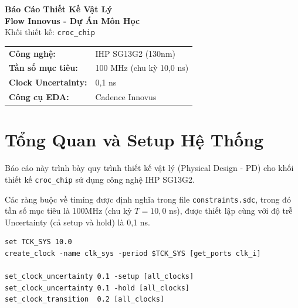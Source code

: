 \documentclass[12pt,a4paper]{article}
\begin{document}
\begin{titlepage}
\centering
\vspace*{2cm}
{\Huge\bfseries Báo Cáo Thiết Kế Vật Lý\\[0.3cm]}
{\Huge\bfseries Flow Innovus - Dự Án Môn Học\\[0.5cm]}
{\Large Khối thiết kế: \texttt{croc\_chip}}\\[1cm]

\vspace{1cm}
{\large
\begin{tabular}{ll}
\textbf{Công nghệ:} & IHP SG13G2 (130nm) \\
\textbf{Tần số mục tiêu:} & 100 MHz (chu kỳ 10,0 ns) \\
\textbf{Clock Uncertainty:} & 0,1 ns \\
\textbf{Công cụ EDA:} & Cadence Innovus \\
\end{tabular}
}

\vspace{2cm}
\vfill
\end{titlepage}

\tableofcontents
\newpage

\section{Tổng Quan và Setup Hệ Thống}
Báo cáo này trình bày quy trình thiết kế vật lý (Physical Design - PD) cho khối thiết kế \texttt{croc\_chip} sử dụng công nghệ IHP SG13G2.

Các ràng buộc về timing được định nghĩa trong file \texttt{constraints.sdc}, trong đó tần số mục tiêu là 100MHz (chu kỳ $T = 10,0$ ns), được thiết lập cùng với độ trễ Uncertainty (cả setup và hold) là 0,1 ns.

\begin{lstlisting}[caption={Quy định timing constraint}]
set TCK_SYS 10.0
create_clock -name clk_sys -period $TCK_SYS [get_ports clk_i]

set_clock_uncertainty 0.1 -setup [all_clocks]
set_clock_uncertainty 0.1 -hold [all_clocks]
set_clock_transition  0.2 [all_clocks]
\end{lstlisting}
\end{document}
